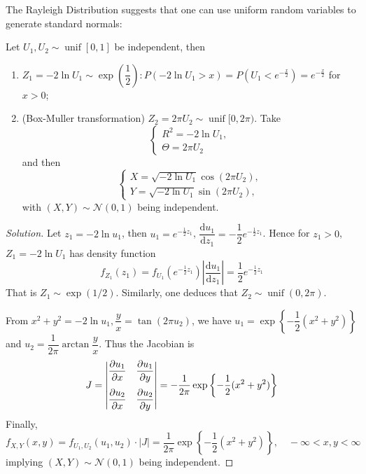 \documentclass[11pt,singlecolumn, openany, citestyle=authoryear]{elegantbook}
\begin{document}
\begin{CJK}{UTF8}{gbsn}
The Rayleigh Distribution suggests that one can use uniform random variables to generate 
standard normals:
\begin{exercise}
Let $U_1,U_2\sim \operatorname*{unif}[0,1]$ be independent, then 
\begin{enumerate}
    \item $Z_1 = -2\ln U_1 \sim \operatorname*{exp}\left(\dfrac{1}{2}\right):
    P(-2\ln U_1>x)=P(U_1<e^{-\frac{x}{2}})=e^{-\frac{x}{2}}$ for $x>0$; 
    \item (Box-Muller transformation) $Z_2=2\pi U_2 \sim \operatorname*{unif}[0,2\pi)$. Take 
    $$
    \begin{cases}
        R^2 = -2 \ln U_1,\\
        \Theta = 2\pi U_2
    \end{cases}
    $$
    and then 
    $$
    \begin{cases}
        X=\sqrt{-2\ln U_1}\cos(2\pi U_2),\\
        Y=\sqrt{-2\ln U_1}\sin(2\pi U_2),
    \end{cases}
    $$
    with $(X,Y)\sim \mathcal{N}(0,1)$ being independent.
\end{enumerate}
\end{exercise}
\begin{proof}[Solution]
    Let $z_1 = -2\ln u_1$, then $u_1 = e^{-\frac{1}{2}z_1}$, 
    $\dfrac{\mathrm{d}u_1}{\mathrm{d}z_1}=-\dfrac{1}{2}e^{-\frac{1}{2}z_1}$. Hence 
    for $z_1>0$, $Z_1 = -2\ln U_1$ has density function
    $$
    f_{Z_1}(z_1) = f_{U_1}(e^{-\frac{1}{2}z_1})\left|\frac{\mathrm{d}u_1}{\mathrm{d}z_1}\right|
    =\frac{1}{2}e^{-\frac{1}{2}z_1}
    $$
    That is $Z_1 \sim \operatorname{exp}(1/2)$.
    Similarly, one deduces that $Z_2 \sim \operatorname{unif}(0,2\pi)$.

    From $x^2+y^2=-2 \ln u_1, \dfrac{y}{x}=\tan (2\pi u_2)$, we have $u_1 = 
    \operatorname{exp} \left\{
        -\dfrac{1}{2}(x^2+y^2)
    \right\}$ and $u_2 = \dfrac{1}{2\pi}\arctan \dfrac{y}{x}$.
    Thus the Jacobian is 
    $$
    J= 
    \begin{vmatrix}
        \vspace{1.5ex}
        \dfrac{\partial u_1}{\partial x} & \dfrac{\partial u_1}{\partial y}\\
        \dfrac{\partial u_2}{\partial x} & \dfrac{\partial u_2}{\partial y}
    \end{vmatrix}=-\frac{1}{2\pi}\operatorname{exp} \left\{
        -\dfrac{1}{2}(x^2+y^2)
    \right\}
    $$
    Finally,
    $$
    f_{X,Y}(x,y)=f_{U_1,U_2}(u_1,u_2)\cdot |J| = 
    \frac{1}{2\pi} \operatorname{exp} \left\{-\dfrac{1}{2}(x^2+y^2) \right\},\quad 
    -\infty < x,y <\infty
    $$
    implying $(X,Y)\sim \mathcal{N}(0,1)$ being independent.
\end{proof}


\end{CJK}
\end{document}
